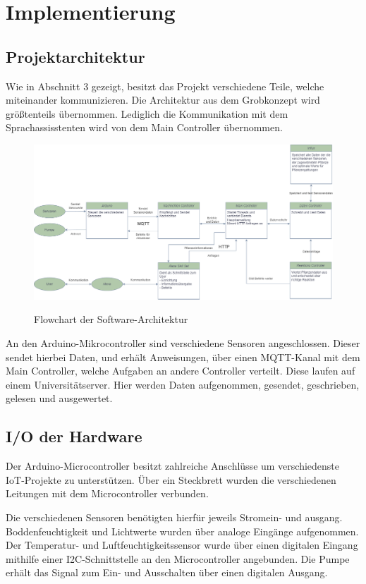 \section{Implementierung} \label{sec_04}

\subsection{Projektarchitektur}
Wie in Abschnitt 3 gezeigt, besitzt das Projekt verschiedene Teile, welche miteinander kommunizieren. Die Architektur aus dem Grobkonzept wird größtenteils übernommen. Lediglich die Kommunikation mit dem Sprachassisstenten wird von dem Main Controller übernommen.

\begin{figure}[H]
\centering
\includegraphics[width=\textwidth]{images/Feinkonzept_Flow.drawio.png}
\caption{Flowchart der Software-Architektur}\cite{rainpoint_smart_timer}
\label{fig:grob_flow}
\end{figure}

An den Arduino-Mikrocontroller sind verschiedene Sensoren angeschlossen. Dieser sendet hierbei Daten, und erhält Anweisungen, über einen MQTT-Kanal mit dem Main Controller, welche Aufgaben an andere Controller verteilt. Diese laufen auf einem Universitätserver. Hier werden Daten aufgenommen, gesendet, geschrieben, gelesen und ausgewertet.

\subsection{I/O der Hardware}
Der Arduino-Microcontroller besitzt zahlreiche Anschlüsse um verschiedenste IoT-Projekte zu unterstützen. Über ein Steckbrett wurden die verschiedenen Leitungen mit dem Microcontroller verbunden.

Die verschiedenen Sensoren benötigten hierfür jeweils Stromein- und ausgang. Boddenfeuchtigkeit und Lichtwerte wurden über analoge Eingänge aufgenommen. Der Temperatur- und Luftfeuchtigkeitssensor wurde über einen digitalen Eingang mithilfe einer I2C-Schnittstelle an den Microcontroller angebunden. Die Pumpe erhält das Signal zum Ein- und Ausschalten über einen digitalen Ausgang.

